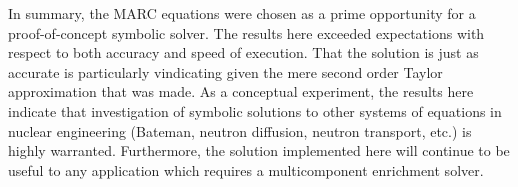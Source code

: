 \documentclass{ansconf}
\begin{document}
In summary, the MARC equations were chosen as a prime opportunity for a 
proof-of-concept symbolic solver.  The results here exceeded expectations with 
respect to
both accuracy and speed of execution.  That the solution is just as accurate 
is particularly vindicating given the mere second order Taylor approximation that 
was made.  As a conceptual experiment, the results here indicate that
investigation of symbolic solutions to other systems of equations in 
nuclear engineering (Bateman, neutron diffusion, neutron transport, etc.) is
highly warranted.  Furthermore, the solution implemented here will continue to be 
useful to any application which requires a multicomponent enrichment solver.

\setlength{\baselineskip}{12pt}



\end{document}
